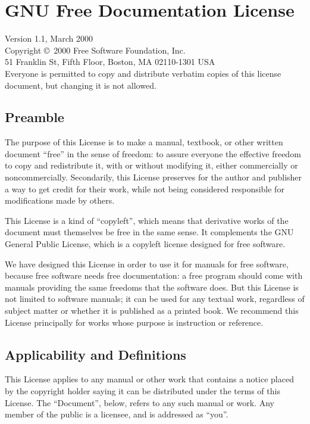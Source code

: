 
\chapter{GNU Free Documentation License}

Version 1.1, March 2000\\

 Copyright \copyright\ 2000  Free Software Foundation, Inc.\\
     51 Franklin St, Fifth Floor, Boston, MA  02110-1301  USA\\
 Everyone is permitted to copy and distribute verbatim copies
 of this license document, but changing it is not allowed.

\section*{Preamble}

The purpose of this License is to make a manual, textbook, or other
written document ``free'' in the sense of freedom: to assure everyone
the effective freedom to copy and redistribute it, with or without
modifying it, either commercially or noncommercially.  Secondarily,
this License preserves for the author and publisher a way to get
credit for their work, while not being considered responsible for
modifications made by others.

This License is a kind of ``copyleft'', which means that derivative
works of the document must themselves be free in the same sense.  It
complements the GNU General Public License, which is a copyleft
license designed for free software.

We have designed this License in order to use it for manuals for free
software, because free software needs free documentation: a free
program should come with manuals providing the same freedoms that the
software does.  But this License is not limited to software manuals;
it can be used for any textual work, regardless of subject matter or
whether it is published as a printed book.  We recommend this License
principally for works whose purpose is instruction or reference.

\section{Applicability and Definitions}

This License applies to any manual or other work that contains a
notice placed by the copyright holder saying it can be distributed
under the terms of this License.  The ``Document'', below, refers to any
such manual or work.  Any member of the public is a licensee, and is
addressed as ``you''.

